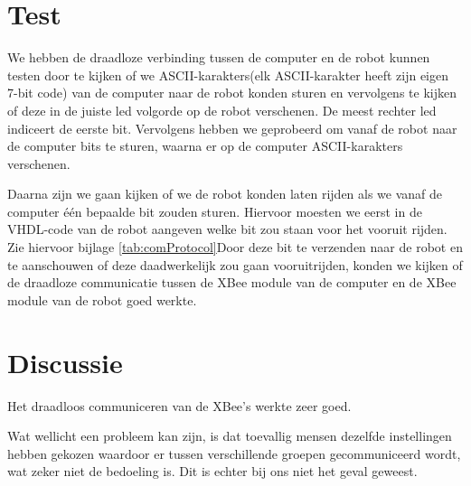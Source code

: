 \documentclass{report}
\begin{document}
\section{Test}

We hebben de draadloze verbinding tussen de computer en de robot kunnen testen door te kijken of we ASCII-karakters(elk ASCII-karakter heeft zijn eigen 7-bit code) van de computer naar de robot konden sturen en vervolgens te kijken of deze in de juiste led volgorde op de robot verschenen. De meest rechter led indiceert de eerste bit. Vervolgens hebben we geprobeerd om vanaf de robot naar de computer bits te sturen, waarna er op de computer ASCII-karakters verschenen.

Daarna zijn we gaan kijken of we de robot konden laten rijden als we vanaf de computer één bepaalde bit zouden sturen. Hiervoor moesten we eerst in de VHDL-code van de robot aangeven welke bit zou staan voor het vooruit rijden. Zie hiervoor bijlage \ref{tab:comProtocol}Door deze bit te verzenden naar de robot en te aanschouwen of deze daadwerkelijk zou gaan vooruitrijden, konden we kijken of de draadloze communicatie tussen de XBee module van de computer en de XBee module van de robot goed werkte.

\section{Discussie}

Het draadloos communiceren van de XBee's werkte zeer goed.

Wat wellicht een probleem kan zijn, is dat toevallig mensen dezelfde instellingen hebben gekozen waardoor er tussen verschillende groepen gecommuniceerd wordt, wat zeker niet de bedoeling is.
Dit is echter bij ons niet het geval geweest.
\end{document}
